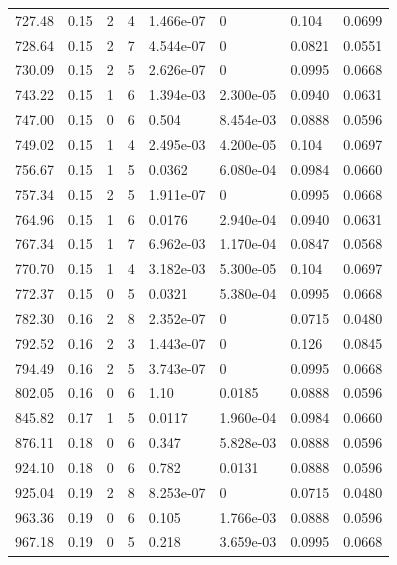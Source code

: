 \documentclass[preview]{standalone}
\begin{document}
{{{\begin{tabular}{L{1.2cm}C{1.2cm} C{0.3cm}C{0.5cm} C{1.4cm}C{1.4cm} C{1.4cm}C{1.4cm}}
  727.48  &  0.15  & 2     &  4 &  1.466e-07  & 0  & 0.104 &  0.0699   \\ 
  728.64  &  0.15  & 2     &  7 &  4.544e-07  & 0  & 0.0821 &  0.0551   \\ 
  730.09  &  0.15  & 2     &  5 &  2.626e-07  & 0  & 0.0995 &  0.0668   \\ 
  743.22  &  0.15  & 1     &  6 &  1.394e-03  & 2.300e-05  & 0.0940 &  0.0631   \\ 
  747.00  &  0.15  & 0     &  6 &  0.504  & 8.454e-03  & 0.0888 &  0.0596   \\ 
  749.02  &  0.15  & 1     &  4 &  2.495e-03  & 4.200e-05  & 0.104 &  0.0697   \\ 
  756.67  &  0.15  & 1     &  5 &  0.0362  & 6.080e-04  & 0.0984 &  0.0660   \\ 
  757.34  &  0.15  & 2     &  5 &  1.911e-07  & 0  & 0.0995 &  0.0668   \\ 
  764.96  &  0.15  & 1     &  6 &  0.0176  & 2.940e-04  & 0.0940 &  0.0631   \\ 
  767.34  &  0.15  & 1     &  7 &  6.962e-03  & 1.170e-04  & 0.0847 &  0.0568   \\ 
  770.70  &  0.15  & 1     &  4 &  3.182e-03  & 5.300e-05  & 0.104 &  0.0697   \\ 
  772.37  &  0.15  & 0     &  5 &  0.0321  & 5.380e-04  & 0.0995 &  0.0668   \\ 
  782.30  &  0.16  & 2     &  8 &  2.352e-07  & 0  & 0.0715 &  0.0480   \\ 
  792.52  &  0.16  & 2     &  3 &  1.443e-07  & 0  & 0.126 &  0.0845   \\ 
  794.49  &  0.16  & 2     &  5 &  3.743e-07  & 0  & 0.0995 &  0.0668   \\ 
  802.05  &  0.16  & 0     &  6 &  1.10  & 0.0185  & 0.0888 &  0.0596   \\ 
  845.82  &  0.17  & 1     &  5 &  0.0117  & 1.960e-04  & 0.0984 &  0.0660   \\ 
  876.11  &  0.18  & 0     &  6 &  0.347  & 5.828e-03  & 0.0888 &  0.0596   \\ 
  924.10  &  0.18  & 0     &  6 &  0.782  & 0.0131  & 0.0888 &  0.0596   \\ 
  925.04  &  0.19  & 2     &  8 &  8.253e-07  & 0  & 0.0715 &  0.0480   \\ 
  963.36  &  0.19  & 0     &  6 &  0.105  & 1.766e-03  & 0.0888 &  0.0596   \\ 
  967.18  &  0.19  & 0     &  5 &  0.218  & 3.659e-03  & 0.0995 &  0.0668   \\ 

\end{tabular}}}}
\end{document}
